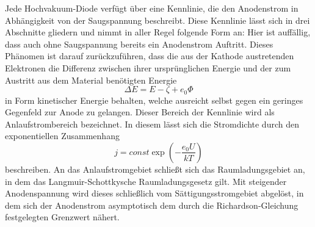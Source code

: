 Jede Hochvakuum-Diode verfügt über eine Kennlinie, die den Anodenstrom in Abhängigkeit von der Saugspannung beschreibt. Diese Kennlinie lässt 
sich in drei Abschnitte gliedern und nimmt in aller Regel folgende Form an:
Hier ist auffällig, dass auch ohne Saugspannung bereits ein Anodenstrom Auftritt. Dieses Phänomen ist darauf zurückzuführen, 
dass die aus der Kathode austretenden Elektronen die Differenz zwischen ihrer ursprünglichen Energie und der zum Austritt aus dem Material benötigten Energie
\begin{equation}
\Delta E=E-\zeta+e_0\Phi
\end{equation}
in Form kinetischer Energie behalten, welche ausreicht selbst gegen ein geringes Gegenfeld zur Anode zu gelangen. Dieser Bereich der Kennlinie wird als
Anlaufstrombereich bezeichnet. In diesem lässt sich die Stromdichte durch den exponentiellen Zusammenhang
\begin{equation}
j=const\exp(-\frac{e_0U}{kT})
\end{equation}
beschreiben. An das Anlaufstromgebiet schließt sich das Raumladungsgebiet an, in dem das Langmuir-Schottkysche Raumladungsgesetz gilt. Mit steigender
Anodenspannung wird dieses schließlich vom Sättigungsstromgebiet abgelöst, in dem sich der Anodenstrom asymptotisch dem durch die Richardson-Gleichung
festgelegten Grenzwert nähert.


